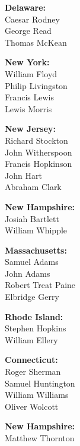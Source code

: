 \begin{multicols}{3}
\begin{itemize}[wide,labelsep=*]
{\item[] \textbf{Delaware:}\\
Caesar Rodney\\
George Read\\
Thomas McKean


\item[] \textbf{New York:}\\
William Floyd\\
Philip Livingston\\
Francis Lewis\\
Lewis Morris

\item[] \textbf{New Jersey:}\\
Richard Stockton\\
John Witherspoon\\
Francis Hopkinson\\
John Hart\\
Abraham Clark


\item[] \textbf{New Hampshire:}\\
Josiah Bartlett\\
William Whipple

\item[] \textbf{Massachusetts:}\\
Samuel Adams\\
John Adams\\
Robert Treat Paine\\
Elbridge Gerry

\item[] \textbf{Rhode Island:}\\
Stephen Hopkins\\
William Ellery

\item[] \textbf{Connecticut:}\\
Roger Sherman\\
Samuel Huntington\\
William Williams\\
Oliver Wolcott

\item[] \textbf{New Hampshire:}\\
Matthew Thornton
}

\end{itemize}

\end{multicols}

